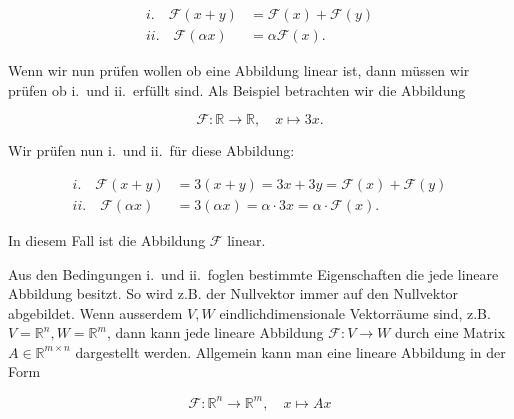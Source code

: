 \begin{equation*}
    \begin{aligned}
        i. \quad \mathcal{F}(x + y) &= \mathcal{F}(x) + \mathcal{F}(y) \\
        ii. \quad \mathcal{F}(\alpha x) &= \alpha \mathcal{F}(x).
    \end{aligned}
\end{equation*}

\vspace{0.5\baselineskip}

Wenn wir nun prüfen wollen ob eine Abbildung linear ist, dann müssen wir prüfen ob i.\ und ii.\ erfüllt sind. Als Beispiel betrachten wir die Abbildung

\begin{equation*}
    \mathcal{F}: \mathbb{R} \rightarrow \mathbb{R}, \quad x \mapsto 3x. 
\end{equation*}

\vspace{0.5\baselineskip}

Wir prüfen nun i.\ und ii.\ für diese Abbildung:

\begin{equation*}
    \begin{aligned}
        i. \quad \mathcal{F}(x + y) &= 3(x + y) = 3x + 3y = \mathcal{F}(x) + \mathcal{F}(y) \\
        ii. \quad \mathcal{F}(\alpha x) &= 3(\alpha x) = \alpha \cdot 3x = \alpha \cdot \mathcal{F}(x).
    \end{aligned}
\end{equation*}

\vspace{0.5\baselineskip}

In diesem Fall ist die Abbildung \( \mathcal{F} \) linear. 

\vspace{1\baselineskip}

Aus den Bedingungen i.\ und ii.\ foglen bestimmte Eigenschaften die jede lineare Abbildung besitzt. So wird z.B. der Nullvektor immer auf den Nullvektor abgebildet. Wenn ausserdem \( V, W \) eindlichdimensionale Vektorräume sind, z.B. \( V = \mathbb{R}^n, W = \mathbb{R}^m \), dann kann jede lineare Abbildung \( \mathcal{F}: V \rightarrow W \)  durch eine Matrix \( A \in \mathbb{R}^{m \times n} \) dargestellt werden. Allgemein kann man eine lineare Abbildung in der Form

\begin{equation*}
    \mathcal{F}: \mathbb{R}^n \rightarrow \mathbb{R}^m, \quad x \mapsto Ax
\end{equation*}

